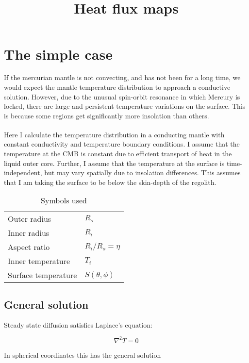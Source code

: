 \documentclass[a4paper,10pt]{article}
\title{Heat flux maps}
\author{}
\date{}
\begin{document}
\maketitle

\section{ The simple case}


If the mercurian mantle is not convecting, and has not been for a long time, we would expect the mantle temperature distribution to approach a conductive solution.  
However, due to the unusual spin-orbit resonance in which Mercury is locked, there are large and persistent temperature variations on the surface.
This is because some regions get significantly more insolation than others.
\\
\\
Here I calculate the temperature distribution in a conducting mantle with constant conductivity and temperature boundary conditions.  
I assume that the temperature at the CMB is constant due to efficient transport of heat in the liquid outer core.  
Further, I assume that the temperature at the surface is time-independent, but may vary spatially due to insolation differences.  
This assumes that I am taking the surface to be below the skin-depth of the regolith.

\begin{table}[h]
\centering
\begin{tabular}{l l}
Outer radius & $R_o$ \\
Inner radius & $R_i$ \\
Aspect ratio & $R_i/R_o = \eta$ \\
Inner temperature & $T_i$ \\
Surface temperature & $S(\theta, \phi)$ \\
\end{tabular}
\caption{Symbols used}
\end{table}


\subsection{General solution}

Steady state diffusion satisfies Laplace's equation:

\begin{equation}
\nabla^2 T = 0
\end{equation}

In spherical coordinates this has the general solution
\end{document}
